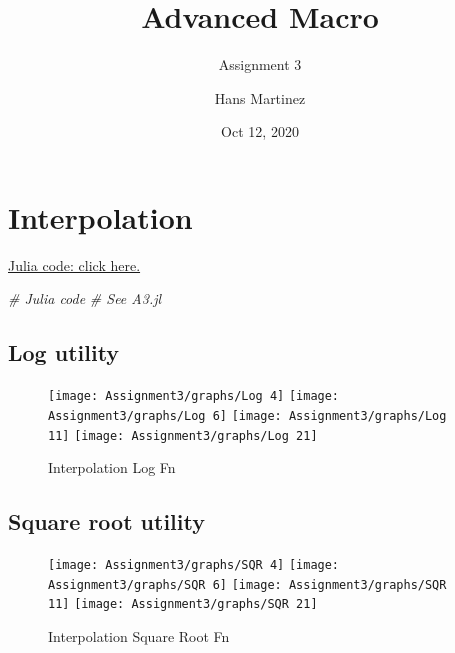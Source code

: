 \documentclass[]{article}
\title{Advanced Macro}
\subtitle{Assignment 3}
\author{Hans Martinez}
\date{Oct 12, 2020}
\newenvironment{Shaded}{\begin{snugshade}}{\end{snugshade}}
\newcommand{\CommentTok}[1]{\textcolor[rgb]{0.56,0.35,0.01}{\textit{#1}}}
\begin{document}
\maketitle

\hypertarget{interpolation}{%
\section{Interpolation}\label{interpolation}}

\href{https://github.com/hans-mtz/AdvMacro/blob/master/A3.jl}{Julia
code: click here.}

\begin{Shaded}
\begin{Highlighting}[]
\CommentTok{# Julia code}
\CommentTok{# See A3.jl}
\end{Highlighting}
\end{Shaded}

\hypertarget{log-utility}{%
\subsection{Log utility}\label{log-utility}}

\begin{figure}

{\centering \texttt{[image: Assignment3/graphs/Log 4]} \texttt{[image: Assignment3/graphs/Log 6]} \texttt{[image: Assignment3/graphs/Log 11]} \texttt{[image: Assignment3/graphs/Log 21]} 

}

\caption{Interpolation Log Fn}\label{fig:unnamed-chunk-2}
\end{figure}

\hypertarget{square-root-utility}{%
\subsection{Square root utility}\label{square-root-utility}}

\begin{figure}

{\centering \texttt{[image: Assignment3/graphs/SQR 4]} \texttt{[image: Assignment3/graphs/SQR 6]} \texttt{[image: Assignment3/graphs/SQR 11]} \texttt{[image: Assignment3/graphs/SQR 21]} 

}

\caption{Interpolation Square Root Fn}\label{fig:unnamed-chunk-3}
\end{figure}
\end{document}
